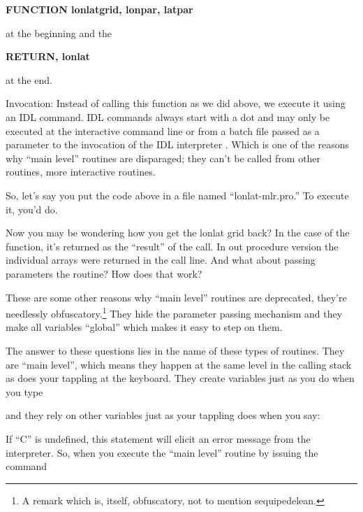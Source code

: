     \textbf{FUNCTION lonlatgrid, lonpar, latpar}

  at the beginning and the


      \textbf{RETURN, lonlat}

  at the end.

    Invocation: Instead of calling this function as we did above, we
    execute it using an IDL  command. IDL 
    commands always start with a dot and {\large may only be executed
    at the interactive command line or from a batch file passed as a
    parameter to the invocation of the IDL interpreter} .  Which is
    one of the reasons why ``main level'' routines are disparaged;
    they can't be called from other routines, more interactive routines.

     So, let's say you put the code above in a file named
     ``lonlat-mlr.pro.'' To execute it,
    you'd do.


    Now you may be wondering how you get the lonlat grid back? In the
    case of the function, it's returned as the ``result'' of the
    call. In out procedure version the individual arrays were returned
    in the call line. And what about passing parameters 
    the routine? How does that work?
  
    These are some other reasons why ``main level'' routines are
    deprecated, they're needlessly obfuscatory.\footnote{A remark
    which is, itself, obfuscatory, not to mention sequipedelean.} They
    hide the parameter passing mechanism and they make all variables
    ``global'' which makes it easy to step on them.

    The answer to these questions lies in the name of these types of
    routines. They are ``main level'', which means they happen at the
    same level in the calling stack as does your tappling at the
    keyboard. They create variables just as you do when you type 


    and they rely on other variables just as your tappling does when
    you say:


    If ``C'' is undefined, this statement will elicit an error message
    from the interpreter. So, when you execute the ``main level''
    routine  by issuing the command 


